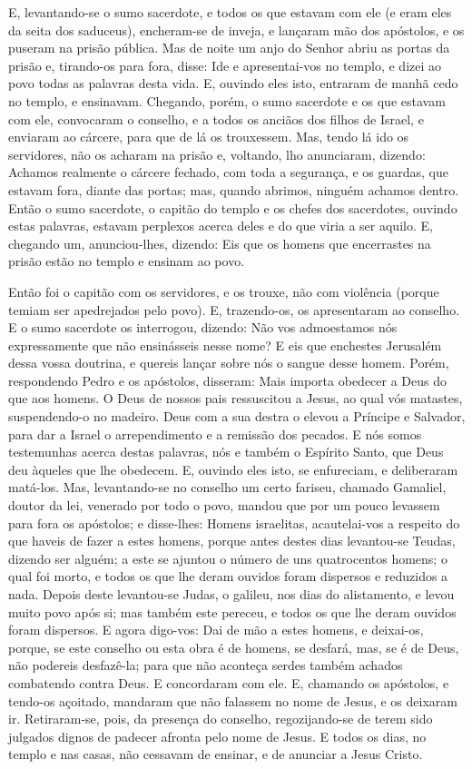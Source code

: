 E, levantando-se o sumo sacerdote, e todos os que estavam com ele
(e eram eles da seita dos saduceus), encheram-se de inveja, e
lançaram mão dos apóstolos, e os puseram na prisão pública.
Mas de noite um anjo do Senhor abriu as portas da prisão e,
tirando-os para fora, disse: Ide e apresentai-vos no templo,
e dizei ao povo todas as palavras desta vida. E, ouvindo eles
isto, entraram de manhã cedo no templo, e ensinavam. Chegando,
porém, o sumo sacerdote e os que estavam com ele, convocaram o
conselho, e a todos os anciãos dos filhos de Israel, e enviaram ao
cárcere, para que de lá os trouxessem. Mas, tendo lá ido os
servidores, não os acharam na prisão e, voltando, lho anunciaram,
dizendo: Achamos realmente o cárcere fechado, com toda a
segurança, e os guardas, que estavam fora, diante das portas; mas,
quando abrimos, ninguém achamos dentro. Então o sumo
sacerdote, o capitão do templo e os chefes dos sacerdotes, ouvindo
estas palavras, estavam perplexos acerca deles e do que viria a ser
aquilo. E, chegando um, anunciou-lhes, dizendo: Eis que os
homens que encerrastes na prisão estão no templo e ensinam ao povo.

Então foi o capitão com os servidores, e os trouxe, não com
violência (porque temiam ser apedrejados pelo povo). E,
trazendo-os, os apresentaram ao conselho. E o sumo sacerdote os
interrogou, dizendo: Não vos admoestamos nós expressamente
que não ensinásseis nesse nome? E eis que enchestes Jerusalém dessa
vossa doutrina, e quereis lançar sobre nós o sangue desse homem.
Porém, respondendo Pedro e os apóstolos, disseram: Mais
importa obedecer a Deus do que aos homens. O Deus de nossos
pais ressuscitou a Jesus, ao qual vós matastes, suspendendo-o no
madeiro. Deus com a sua destra o elevou a Príncipe e
Salvador, para dar a Israel o arrependimento e a remissão dos
pecados. E nós somos testemunhas acerca destas palavras, nós
e também o Espírito Santo, que Deus deu àqueles que lhe obedecem.
E, ouvindo eles isto, se enfureciam, e deliberaram matá-los.
Mas, levantando-se no conselho um certo fariseu, chamado
Gamaliel, doutor da lei, venerado por todo o povo, mandou que por um
pouco levassem para fora os apóstolos; e disse-lhes: Homens
israelitas, acautelai-vos a respeito do que haveis de fazer a estes
homens, porque antes destes dias levantou-se Teudas, dizendo
ser alguém; a este se ajuntou o número de uns quatrocentos homens; o
qual foi morto, e todos os que lhe deram ouvidos foram dispersos e
reduzidos a nada. Depois deste levantou-se Judas, o galileu,
nos dias do alistamento, e levou muito povo após si; mas também este
pereceu, e todos os que lhe deram ouvidos foram dispersos. E
agora digo-vos: Dai de mão a estes homens, e deixai-os, porque, se
este conselho ou esta obra é de homens, se desfará, mas, se é
de Deus, não podereis desfazê-la; para que não aconteça serdes
também achados combatendo contra Deus. E concordaram com ele.
E, chamando os apóstolos, e tendo-os açoitado, mandaram que não
falassem no nome de Jesus, e os deixaram ir. Retiraram-se,
pois, da presença do conselho, regozijando-se de terem sido julgados
dignos de padecer afronta pelo nome de Jesus. E todos os
dias, no templo e nas casas, não cessavam de ensinar, e de anunciar
a Jesus Cristo.

